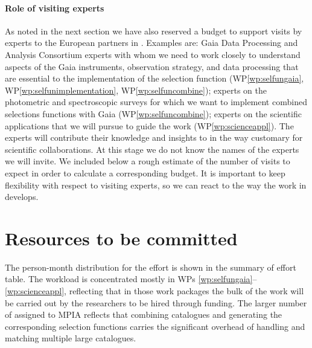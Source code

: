 \paragraph{Role of visiting experts} As noted in the next section we have also reserved a budget to support visits by experts to the European partners in {\acro}. Examples are: Gaia Data Processing and Analysis Consortium experts with whom we need to work closely to understand aspects of the Gaia instruments, observation strategy, and data processing that are essential to the implementation of the selection function (WP\ref{wp:selfungaia}, WP\ref{wp:selfunimplementation}, WP\ref{wp:selfuncombine}); experts on the photometric and spectroscopic surveys for which we want to implement combined selections functions with Gaia (WP\ref{wp:selfuncombine}); experts on the scientific applications that we will pursue to guide the {\acro} work (WP\ref{wp:scienceappl}). The experts will contribute their knowledge and insights to {\acro} in the way customary for scientific collaborations. At this stage we do not know the names of the experts we will invite. We included below a rough estimate of the number of visits to expect in order to calculate a corresponding budget. It is important to keep flexibility with respect to visiting experts, so we can react to the way the work in {\acro} develops.

\section{Resources to be committed}
\label{sec:resources}

The person-month distribution for the {\acro} effort is shown in the summary of effort table. The workload is concentrated mostly in WPs \ref{wp:selfungaia}--\ref{wp:scienceappl}, reflecting that in those work packages the bulk of the work will be carried out by the researchers to be hired through {\acro} funding. The larger number of {\pems} assigned to MPIA reflects that combining catalogues and generating the corresponding selection functions carries the significant overhead of handling and matching multiple large catalogues.

